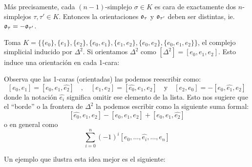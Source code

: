 \documentclass[../../topologia_algebraica]{subfiles}
\begin{document}
M\'as precisamente, cada $(n-1)$-simplejo $\sigma\in K$ es cara de exactamente dos $n$-simplejos
$\tau,\tau'\in K$. Entonces la orientaciones $\mathfrak{o}_{\tau}$ y $\mathfrak{o}_{\tau'}$ deben ser distintas, ie.
$\mathfrak{o}_{\tau}=-\mathfrak{o}_{\tau'}$.

\begin{figure}[h!]%
  \centering
\end{figure}%

\begin{ejemplo}
  Toma $K=\{\{e_0\},\{e_1\},\{e_2\},\{e_0,e_1\},\{e_1,e_2\},\{e_0,e_2\},\{e_0,e_1,e_2\}\}$, el complejo
  simplicial inducido por $\Delta^2$. Si orientamos $\Delta^2$ como $[\Delta^2]=[e_0,e_1,e_2]$. Esto
  induce una orientaci\'on en cada 1-cara:

\begin{figure}[h!]%
  \centering
\end{figure}%

  Observa que las 1-caras (orientadas) las podemos reescribir como:
  \[
    [e_0,e_1]=[e_0,e_1,\hat{e_2}] \quad,\quad
    [e_1,e_2]=[\hat{e_0},e_1,e_2] \quad\text{y}\quad
    [e_2,e_0]=-[e_0,\hat{e_1},e_2]
  \]
  donde la notaci\'on $\hat{e_i}$ significa omitir ese elemento de la lista. Esto nos sugiere que el ``borde''
  o la frontera de $\Delta^2$ la podemos escribir como la siguiente suma formal:
  \[
    [\hat{e_0},e_1,e_2]-[e_0,\hat{e_1},e_2]+[e_0,e_1,\hat{e_2}]
  \]
  o en general como
  \begin{equation}\label{eq:frontera_complejo}
    \sum_{i=0}^n (-1)^i[e_0,\ldots,\hat{e_i},\ldots,e_n]
  \end{equation}

  Un ejemplo que ilustra esta idea mejor es el siguiente:
\end{ejemplo}
\end{document}
